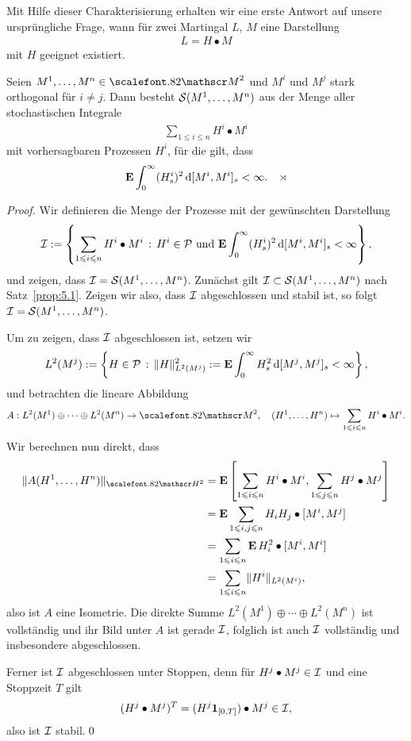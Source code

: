 Mit Hilfe dieser Charakterisierung erhalten wir eine erste Antwort auf unsere
ursprüngliche Frage, wann für zwei Martingal $L$, $M$ eine Darstellung
\begin{align*}
L = H\bullet M
\end{align*}
mit $H$ geeignet existiert.

\begin{theorem}
\label{prop:5.2}
Seien $M^1,\ldots,M^n \in \MM^2$ und $M^i$ und $M^j$ stark orthogonal für
$i\neq j$. Dann besteht $\mathcal{S}(M^1,\ldots,M^n)$ aus der Menge aller stochastischen
Integrale
\begin{align*}
\sum_{1\le i\le n} H^i \bullet M^i
\end{align*}
mit vorhersagbaren Prozessen $H^i$, für die gilt, dass
\begin{align*}
\E \int_0^\infty (H^i_s)^2 \, \diffd[M^i,M^i]_s < \infty.\fish
\end{align*}
\end{theorem}

\begin{proof}
Wir definieren die Menge der Prozesse mit der gewünschten Darstellung
\begin{align*}
\II \defl \setdef*{\sum_{1\le i\le n} H^i\bullet
M^i}{H^i\in\PP\text{ und }\E \int_0^\infty (H_s^i)^2\, \diffd[M^i,M^i]_s <
\infty},
\end{align*}
und zeigen, dass $\mathcal{I} = \mathcal{S}(M^1,\ldots,M^n)$. Zunächst gilt $\mathcal{I} \subset
\mathcal{S}(M^1,\ldots,M^n)$ nach Satz~\ref{prop:5.1}. Zeigen wir also, dass $\mathcal{I}$
abgeschlossen und stabil ist, so folgt $\mathcal{I} = \mathcal{S}(M^1,\ldots,M^n)$.

Um zu zeigen, dass $\mathcal{I}$ abgeschlossen ist, setzen wir
\begin{align*}
L^2(M^j) \defl \setdef*{H\in\PP}{\norm{H}_{L^2(M^j)}^2 \defl \E\int_0^\infty
H_s^2 \,\diffd[M^j,M^j]_s < \infty},
\end{align*}
und betrachten die lineare Abbildung
\begin{align*}
A: L^2(M^1)\oplus \cdots\oplus L^2(M^n) \to \MM^2,\quad (H^1,\ldots,H^n)\mapsto
\sum_{1\le i\le n} H^i\bullet M^i.
\end{align*}
Wir berechnen nun direkt, dass
\begin{align*}
\norm{A(H^1,\ldots,H^n)}_{\HH^2} &= \E\left[\sum_{1\le i\le n} H^i\bullet
M^i,\sum_{1\le j\le n} H^j\bullet M^j\right]\\ & = 
\E\sum_{1\le i,j\le n} H_iH_j\bullet [M^i,M^j]\\
&= \sum_{1\le i\le n} \E\, H_i^2\bullet [M^i,M^i]\\
&= \sum_{1\le i\le n}\norm{H^i}_{L^2(M^i)},
\end{align*} 
also ist $A$ eine Isometrie. Die direkte Summe $L^2(M^1)\oplus \cdots\oplus
L^2(M^n)$ ist vollständig und ihr Bild unter $A$ ist gerade $\mathcal{I}$, folglich ist
auch $\mathcal{I}$ vollständig und insbesondere abgeschlossen.

Ferner ist $\mathcal{I}$ abgeschlossen unter Stoppen, denn für $H^j\bullet M^j\in \mathcal{I}$
und eine Stoppzeit $T$ gilt
\begin{align*}
(H^j\bullet M^j)^T = (H^j\mathbf{1}_{[0,T]})\bullet M^j\in\mathcal{I},
\end{align*}
also ist $\mathcal{I}$ stabil.\qed  
\end{proof}


